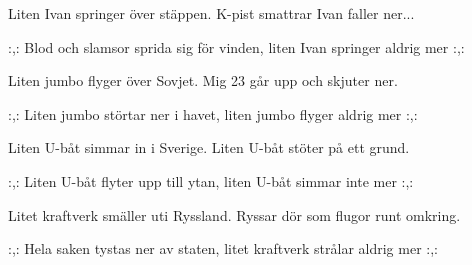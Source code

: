 


	
\beginverse*		%
Liten Ivan springer över stäppen.
K-pist smattrar Ivan faller ner...
\endverse			%

\beginchorus
:,: Blod och slamsor sprida sig för vinden,
liten Ivan springer aldrig mer :,:
\endchorus

\beginverse*		%
Liten jumbo flyger över Sovjet.
Mig 23 går upp och skjuter ner.
\endverse			%

\beginchorus
:,: Liten jumbo störtar ner i havet,
liten jumbo flyger aldrig mer :,:
\endchorus

\beginverse*		%
Liten U-båt simmar in i Sverige.
Liten U-båt stöter på ett grund.
\endverse			%

\beginchorus
:,: Liten U-båt flyter upp till ytan,
liten U-båt simmar inte mer :,:
\endchorus

\beginverse*		%
Litet kraftverk smäller uti Ryssland.
Ryssar dör som flugor runt omkring.
\endverse			%

\beginchorus
:,: Hela saken tystas ner av staten,
litet kraftverk strålar aldrig mer :,:
\endchorus
\endsong			%
